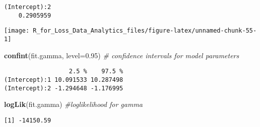 \documentclass[]{book}
\newenvironment{Shaded}{\begin{snugshade}}{\end{snugshade}}
\newcommand{\KeywordTok}[1]{\textcolor[rgb]{0.13,0.29,0.53}{\textbf{#1}}}
\newcommand{\DataTypeTok}[1]{\textcolor[rgb]{0.13,0.29,0.53}{#1}}
\newcommand{\DecValTok}[1]{\textcolor[rgb]{0.00,0.00,0.81}{#1}}
\newcommand{\FloatTok}[1]{\textcolor[rgb]{0.00,0.00,0.81}{#1}}
\newcommand{\StringTok}[1]{\textcolor[rgb]{0.31,0.60,0.02}{#1}}
\newcommand{\CommentTok}[1]{\textcolor[rgb]{0.56,0.35,0.01}{\textit{#1}}}
\newcommand{\OperatorTok}[1]{\textcolor[rgb]{0.81,0.36,0.00}{\textbf{#1}}}
\newcommand{\NormalTok}[1]{#1}
\theoremstyle{definition}
\theoremstyle{definition}
\theoremstyle{definition}
\theoremstyle{remark}
\begin{document}
\begin{verbatim}
(Intercept):2 
    0.2905959 
\end{verbatim}

\begin{Shaded}
\end{Shaded}

\begin{center}\texttt{[image: R\_for\_Loss\_Data\_Analytics\_files/figure-latex/unnamed-chunk-55-1]} \end{center}

\begin{Shaded}
\begin{Highlighting}[]
\KeywordTok{confint}\NormalTok{(fit.gamma, }\DataTypeTok{level=}\FloatTok{0.95}\NormalTok{)  }\CommentTok{# confidence intervals for model parameters }
\end{Highlighting}
\end{Shaded}

\begin{verbatim}
                  2.5 %    97.5 %
(Intercept):1 10.091533 10.287498
(Intercept):2 -1.294648 -1.176995
\end{verbatim}

\begin{Shaded}
\begin{Highlighting}[]
\KeywordTok{logLik}\NormalTok{(fit.gamma)               }\CommentTok{#loglikelihood for gamma}
\end{Highlighting}
\end{Shaded}

\begin{verbatim}
[1] -14150.59
\end{verbatim}
\end{document}
